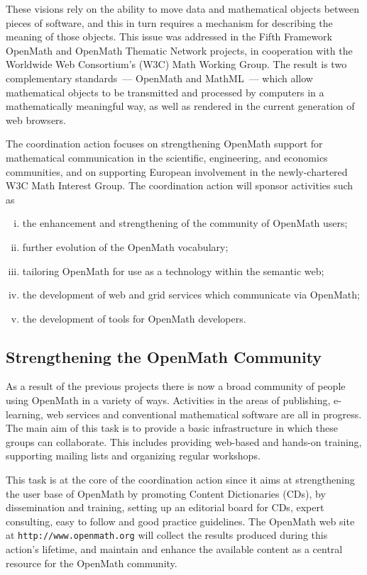 \documentclass{euproposal}
\begin{document}
These visions rely on the ability to move data and mathematical
objects between pieces of software, and this in turn requires a
mechanism for describing the meaning of those objects.  This issue was
addressed in the Fifth Framework OpenMath and OpenMath Thematic
Network projects, in cooperation with the Worldwide Web Consortium's
(W3C) Math Working Group.  The result is two complementary
standards~--- OpenMath and MathML~--- which allow mathematical objects
to be transmitted and processed by computers in a mathematically
meaningful way, as well as rendered in the current generation of web
browsers.

The coordination action focuses on strengthening OpenMath support for
mathematical communication in the scientific, engineering, and
economics communities, and on supporting European involvement in the
newly-chartered W3C Math Interest Group.  The coordination action will
sponsor activities such as

\begin{enumerate}[(i)]
\item the enhancement and strengthening of the community of OpenMath
  users;
\item further evolution of the OpenMath vocabulary;
\item tailoring OpenMath for use as a technology within the semantic
  web;
\item the development of web and grid services which communicate via
  OpenMath;
\item the development of tools for OpenMath developers.
\end{enumerate}


\subsection{Strengthening the OpenMath Community}\label{community}


As a result of the previous projects there is now a broad community of
people using OpenMath in a variety of ways.  Activities in the areas
of publishing, e-learning, web services and conventional mathematical
software are all in progress.  The main aim of this task is to provide
a basic infrastructure in which these groups can collaborate. This
includes providing web-based and hands-on training, supporting mailing
lists and organizing regular workshops.

This task is at the core of the coordination action since it aims at
strengthening the user base of OpenMath by promoting Content
Dictionaries (CDs), by dissemination and training, setting up an editorial
board for CDs, expert consulting, easy to follow and good practice
guidelines. The OpenMath web site at \texttt{http://www.openmath.org}
will collect the results produced during this action's lifetime, and
maintain and enhance the available content as a central resource for
the OpenMath community. 
\end{document}
